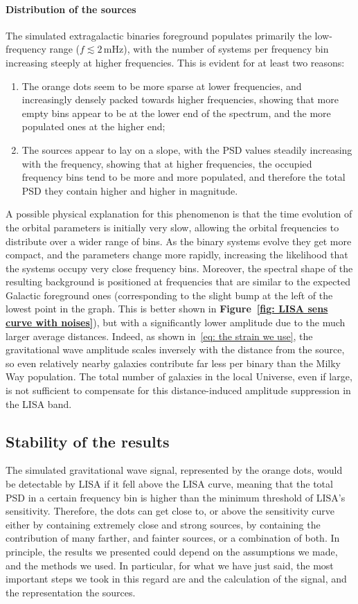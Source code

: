 \paragraph{Distribution of the sources}
The simulated extragalactic binaries foreground populates primarily the low-frequency range ($f \lesssim 2\,\mathrm{mHz}$), with the number of systems per frequency bin increasing steeply at higher frequencies. 
This is evident for at least two reasons:
\begin{enumerate}
    \item The orange dots seem to be more sparse at lower frequencies, and increasingly densely packed towards higher frequencies, showing that more empty bins appear to be at the lower end of the spectrum, and the more populated ones at the higher end;
    \item The sources appear to lay on a slope, with the PSD values steadily increasing with the frequency, showing that at higher frequencies, the occupied frequency bins tend to be more and more populated, and therefore the total PSD they contain higher and higher in magnitude.
\end{enumerate}
A possible physical explanation for this phenomenon is that the time evolution of the orbital parameters is initially very slow, allowing the orbital frequencies to distribute over a wider range of bins.
As the binary systems evolve they get more compact, and the parameters change more rapidly, increasing the likelihood that the systems occupy very close frequency bins.
Moreover, the spectral shape of the resulting background is positioned at frequencies that are similar to the expected Galactic foreground ones (corresponding to the slight bump at the left of the lowest point in the graph. 
This is better shown in \textbf{Figure~\ref{fig: LISA sens curve with noises}}), but with a significantly lower amplitude due to the much larger average distances.
Indeed, as shown in~\eqref{eq: the strain we use}, the gravitational wave amplitude scales inversely with the distance from the source, so even relatively nearby galaxies contribute far less per binary than the Milky Way population. 
The total number of galaxies in the local Universe, even if large, is not sufficient to compensate for this distance-induced amplitude suppression in the LISA band.


\subsection{Stability of the results}
The simulated gravitational wave signal, represented by the orange dots, would be detectable by LISA if it fell above the LISA curve, meaning that the total PSD in a certain frequency bin is higher than the minimum threshold of LISA's sensitivity.
Therefore, the dots can get close to, or above the sensitivity curve either by containing extremely close and strong sources, by containing the contribution of many farther, and fainter sources, or a combination of both.
In principle, the results we presented could depend on the assumptions we made, and the methods we used.
In particular, for what we have just said, the most important steps we took in this regard are and the calculation of the signal, and the representation the sources.

